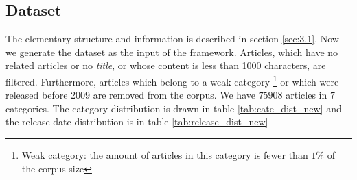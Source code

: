 \subsection{Dataset}

The elementary structure and information is described in section \ref{sec:3.1}. Now we generate the dataset as the input of the framework. Articles, which have no related articles or no \textit{title}, or whose content is less than 1000 characters, are filtered. Furthermore, articles which belong to a weak category \footnote{Weak category: the amount of articles in this category is fewer than $1\%$ of the corpus size} or which were released before 2009 are removed from the corpus. We have $75908$ articles in $7$ categories. The category distribution is drawn in table \ref{tab:cate_dist_new} and the release date distribution is in table \ref{tab:release_dist_new}

